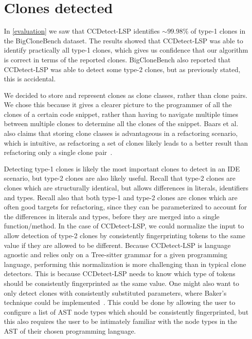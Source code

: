 \section{Clones detected}

In \cref{evaluation} we saw that CCDetect-LSP identifies ${\sim}99.98\%$ of type-1 clones in
the BigCloneBench dataset. The results showed that CCDetect-LSP was able to identify
practically all type-1 clones, which gives us confidence that our algorithm is correct in
terms of the reported clones. BigCloneBench also reported that CCDetect-LSP was able to
detect some type-2 clones, but as previously stated, this is accidental.

We decided to store and represent clones as clone classes, rather than clone pairs. We
chose this because it gives a clearer picture to the programmer of all the clones of a
certain code snippet, rather than having to navigate multiple times between multiple
clones to determine all the clones of the snippet. Baars et al. also claims that storing
clone classes is advantageous in a refactoring scenario, which is intuitive, as
refactoring a set of clones likely leads to a better result than refactoring only a single
clone pair~\cite{TowardsAutomatedRefactoring}.

Detecting type-1 clones is likely the most important clones to detect in an IDE scenario,
but type-2 clones are also likely useful. Recall that type-2 clones are clones which are
structurally identical, but allows differences in literals, identifiers and types. Recall
also that both type-1 and type-2 clones are clones which are often good targets for
refactoring, since they can be parameterized to account for the differences in literals
and types, before they are merged into a single function/method. In the case of
CCDetect-LSP, we could normalize the input to allow detection of type-2 clones by
consistently fingerprinting tokens to the same value if they are allowed to be different.
Because CCDetect-LSP is language agnostic and relies only on a Tree-sitter grammar for a
given programming language, performing this normalization is more challenging than in
typical clone detectors. This is because CCDetect-LSP needs to know which type of tokens
should be consistently fingerprinted as the same value. One might also want to only detect
clones with consistently substituted parameters, where Baker's technique could be
implemented~\cite{Bakerdup}. This could be done by allowing the user to configure a list
of AST node types which should be consistently fingerprinted, but this also requires the
user to be intimately familiar with the node types in the AST of their chosen programming
language.

